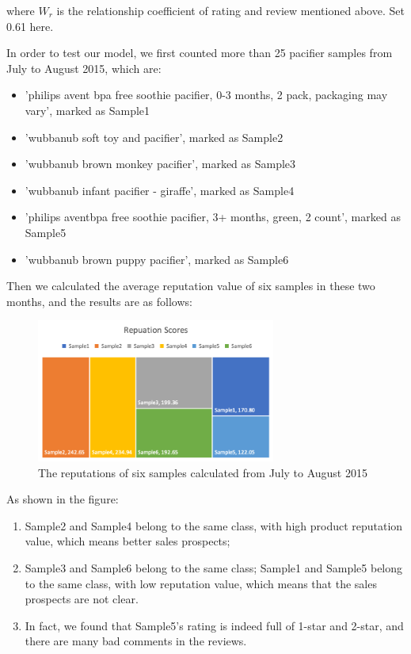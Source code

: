 \documentclass{mcmthesis}
\begin{document}
where $W_{r}$ is the relationship coefficient of rating and review mentioned above. Set 0.61 here.

In order to test our model, we first counted more than 25 pacifier samples from July to August 2015, which are:
\begin{itemize}
	\item 'philips avent bpa free soothie pacifier, 0-3 months, 2 pack, packaging may vary', marked as Sample1
	\item 'wubbanub soft toy and pacifier', marked as Sample2
	\item 'wubbanub brown monkey pacifier', marked as Sample3
	\item 'wubbanub infant pacifier - giraffe', marked as Sample4
	\item 'philips aventbpa free soothie pacifier, 3+ months, green, 2 count', marked as Sample5
	\item 'wubbanub brown puppy pacifier', marked as Sample6
\end{itemize}

Then we calculated the average reputation value of six samples in these two months, and the results are as follows:
\begin{figure}[H] 
	\centering 
	\includegraphics[width=0.7\textwidth]{figures/reputations.png} 
	\caption{The reputations of six samples calculated from July to August 2015}
	\label{reputations} %
\end{figure}

As shown in the figure:
\begin{enumerate}
	\item Sample2 and Sample4 belong to the same class, with high product reputation value, which means better sales prospects; 
	\item Sample3 and Sample6 belong to the same class; Sample1 and Sample5 belong to the same class, with low reputation value, which means that the sales prospects are not clear.
	\item  In fact, we found that Sample5's rating is indeed full of 1-star and 2-star, and there are many bad comments in the reviews.
\end{enumerate}
\end{document}
